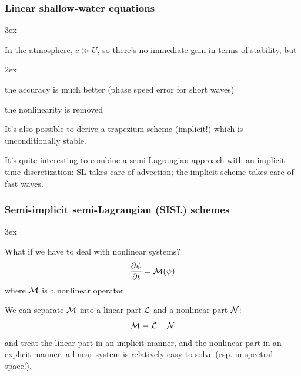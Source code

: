 \documentclass[aspectratio=149,9pt]{beamer}
\begin{document}
%
%
\begin{frame}
	\frametitle{Linear shallow-water equations}
	\begin{myitemize}{3ex}
		\item In the atmosphere, $c \gg U$, so there's no immediate gain in terms of stability, but
			\begin{myitemize}{2ex}
				\item the accuracy is much better (phase speed error for short waves)
				\item the nonlinearity is removed
			\end{myitemize}
		\item It's also possible to derive a trapezium scheme (implicit!) which is unconditionally stable.
		\item It's quite interesting to combine a semi-Lagrangian approach with an implicit time discretization: SL takes care of advection; the implicit scheme takes care of fast waves.
	\end{myitemize}
\end{frame}
%
%
\begin{frame}
	\frametitle{Semi-implicit semi-Lagrangian (SISL) schemes}
	\begin{myitemize}{3ex}
		\item What if we have to deal with nonlinear systems?
			\begin{equation*}
				\frac{\partial \psi}{\partial t} = {\cal M} (\psi )
			\end{equation*}
			where $\cal M$ is a nonlinear operator.
	\pause
		\item We can separate $\cal M$ into a linear part $\cal L$ and a nonlinear part $\cal N$:
			\begin{equation*}
				{\cal M} = {\cal L} + {\cal N}
			\end{equation*}
			and treat the linear part in an implicit manner, and the nonlinear part in an explicit manner: a linear system is relatively easy to solve (esp. in spectral space!).
	\end{myitemize}
\end{frame}
%
%
\end{document}

